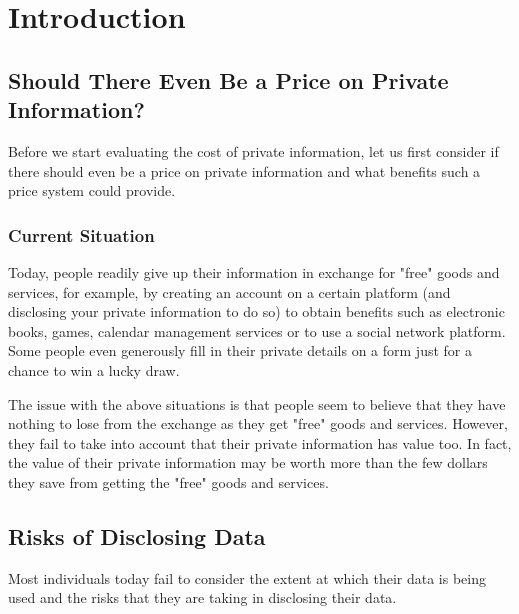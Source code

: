 \documentclass{icmmcm}
\begin{document}
\section{Introduction}%
\label{sec:introduction}
\setcounter{page}{1}
\subsection{Should There Even Be a Price on Private Information?}
Before we start evaluating the cost of private information, let us first consider if there should even be a price on private information and what benefits such a price system could provide.

\subsubsection*{Current Situation}
Today, people readily give up their information in exchange for "free" goods and services, for example, by creating an account on a certain platform (and disclosing your private information to do so) to obtain benefits such as electronic books, games, calendar management services or to use a social network platform. Some people even generously fill in their private details on a form just for a chance to win a lucky draw.

The issue with the above situations is that people seem to believe that they have nothing to lose from the exchange as they get "free" goods and services. However, they fail to take into account that their private information has value too. In fact, the value of their private information may be worth more than the few dollars they save from getting the "free" goods and services.

\subsection{Risks of Disclosing Data}
Most individuals today fail to consider the extent at which their data is being used and the risks that they are taking in disclosing their data.
\end{document}
